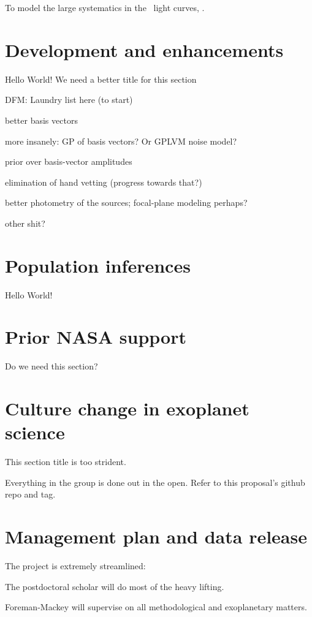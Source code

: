 \documentclass[12pt,preprint]{aastex}
\begin{document}
To model the large systematics in the \ketu\ light curves,
\citet{Foreman-Mackey:2015}.


\section{Development and enhancements}

Hello World!  We need a better title for this section

DFM:  Laundry list here (to start)

better basis vectors

more insanely: GP of basis vectors?  Or GPLVM noise model?

prior over basis-vector amplitudes

elimination of hand vetting (progress towards that?)

better photometry of the sources; focal-plane modeling perhaps?

other shit?

\section{Population inferences}

Hello World!

\section{Prior NASA support}

Do we need this section?

\section{Culture change in exoplanet science}

This section title is too strident.

Everything in the group is done out in the open.
Refer to this proposal's github repo and tag.

\section{Management plan and data release}

The project is extremely streamlined:

The postdoctoral scholar will do most of the heavy lifting.

Foreman-Mackey will supervise on all methodological and exoplanetary
matters.
\end{document}

